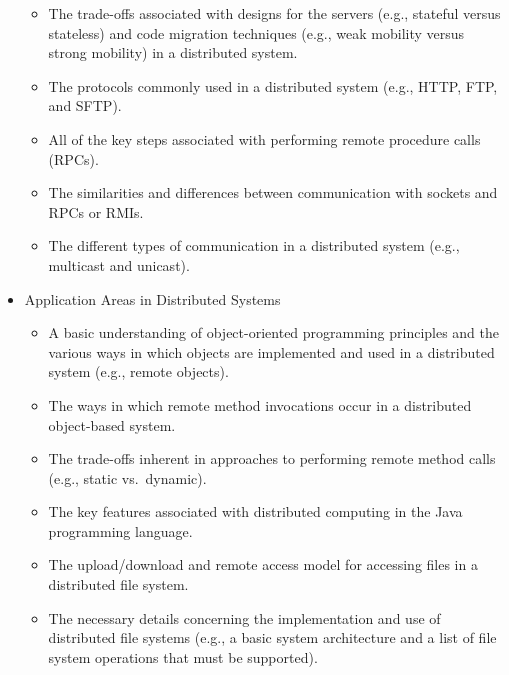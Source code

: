 \begin{itemize}[leftmargin=0.25in]
\begin{itemize}[leftmargin=0in]
      \item The trade-offs associated with designs for the servers (e.g., stateful versus stateless) and code migration
        techniques (e.g., weak mobility versus strong mobility) in a distributed system.

      \item The protocols commonly used in a distributed system (e.g., HTTP, FTP, and SFTP).

      \item All of the key steps associated with performing remote procedure calls (RPCs).

      \item The similarities and differences between communication with sockets and RPCs or RMIs.

      \item The different types of communication in a distributed system (e.g., multicast and unicast).

    \end{itemize}

  \item Application Areas in Distributed Systems

    \vspace*{-.05in}
    \begin{itemize}[leftmargin=0in]

      \itemsep 0in

      \item A basic understanding of object-oriented programming principles and the various ways in which objects are
        implemented and used in a distributed system (e.g., remote objects).

      \item The ways in which remote method invocations occur in a distributed object-based system.

      \item The trade-offs inherent in approaches to performing remote method calls (e.g., static \mbox{vs.\ dynamic}).

      \item The key features associated with distributed computing in the Java programming language.

      \item The upload/download and remote access model for accessing files in a distributed file system.

      \item The necessary details concerning the implementation and use of distributed file systems (e.g., a basic system
        architecture and a list of file system operations that must be supported).


\end{itemize}
\end{itemize}
